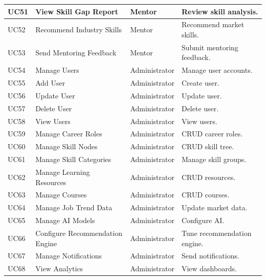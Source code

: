 \begin{longtable}{|>{\centering\arraybackslash}p{1cm}|p{4cm}|p{3.3cm}|p{7.2cm}|}
UC51 &
View Skill Gap Report &
Mentor &
Review skill analysis.
\\
\hline

UC52 &
Recommend Industry Skills &
Mentor &
Recommend market skills.
\\
\hline

UC53 &
Send Mentoring Feedback &
Mentor &
Submit mentoring feedback.
\\
\hline

UC54 &
Manage Users &
Administrator &
Manage user accounts.
\\
\hline

UC55 &
Add User &
Administrator &
Create user.
\\
\hline

UC56 &
Update User &
Administrator &
Update user.
\\
\hline

UC57 &
Delete User &
Administrator &
Delete user.
\\
\hline

UC58 &
View Users &
Administrator &
View users.
\\
\hline

UC59 &
Manage Career Roles &
Administrator &
CRUD career roles.
\\
\hline

UC60 &
Manage Skill Nodes &
Administrator &
CRUD skill tree.
\\
\hline

UC61 &
Manage Skill Categories &
Administrator &
Manage skill groups.
\\
\hline

UC62 &
Manage Learning Resources &
Administrator &
CRUD resources.
\\
\hline

UC63 &
Manage Courses &
Administrator &
CRUD courses.
\\
\hline

UC64 &
Manage Job Trend Data &
Administrator &
Update market data.
\\
\hline

UC65 &
Manage AI Models &
Administrator &
Configure AI.
\\
\hline

UC66 &
Configure Recommendation Engine &
Administrator &
Tune recommendation engine.
\\
\hline

UC67 &
Manage Notifications &
Administrator &
Send notifications.
\\
\hline

UC68 &
View Analytics &
Administrator &
View dashboards.
\\
\hline


\end{longtable}
